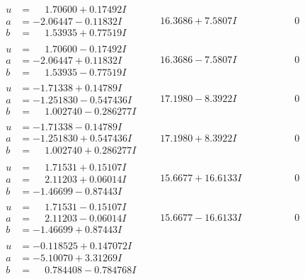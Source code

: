 \documentclass[1p]{elsarticle_modified}
\theoremstyle{definition}
\begin{document}
$$\begin{array}{c|c|c}
 \hline 
\begin{aligned}
u &= \phantom{-}1.70600 + 0.17492 I \\
a &= -2.06447 - 0.11832 I \\
b &= \phantom{-}1.53935 + 0.77519 I\end{aligned}
 & \phantom{-}16.3686 + 7.5807 I & \phantom{-0.000000 } 0 \\ \hline\begin{aligned}
u &= \phantom{-}1.70600 - 0.17492 I \\
a &= -2.06447 + 0.11832 I \\
b &= \phantom{-}1.53935 - 0.77519 I\end{aligned}
 & \phantom{-}16.3686 - 7.5807 I & \phantom{-0.000000 } 0 \\ \hline\begin{aligned}
u &= -1.71338 + 0.14789 I \\
a &= -1.251830 - 0.547436 I \\
b &= \phantom{-}1.002740 - 0.286277 I\end{aligned}
 & \phantom{-}17.1980 - 8.3922 I & \phantom{-0.000000 } 0 \\ \hline\begin{aligned}
u &= -1.71338 - 0.14789 I \\
a &= -1.251830 + 0.547436 I \\
b &= \phantom{-}1.002740 + 0.286277 I\end{aligned}
 & \phantom{-}17.1980 + 8.3922 I & \phantom{-0.000000 } 0 \\ \hline\begin{aligned}
u &= \phantom{-}1.71531 + 0.15107 I \\
a &= \phantom{-}2.11203 + 0.06014 I \\
b &= -1.46699 - 0.87443 I\end{aligned}
 & \phantom{-}15.6677 + 16.6133 I & \phantom{-0.000000 } 0 \\ \hline\begin{aligned}
u &= \phantom{-}1.71531 - 0.15107 I \\
a &= \phantom{-}2.11203 - 0.06014 I \\
b &= -1.46699 + 0.87443 I\end{aligned}
 & \phantom{-}15.6677 - 16.6133 I & \phantom{-0.000000 } 0 \\ \hline\begin{aligned}
u &= -0.118525 + 0.147072 I \\
a &= -5.10070 + 3.31269 I \\
b &= \phantom{-}0.784408 - 0.784768 I\end{aligned}

\end{array}$$
\end{document}
